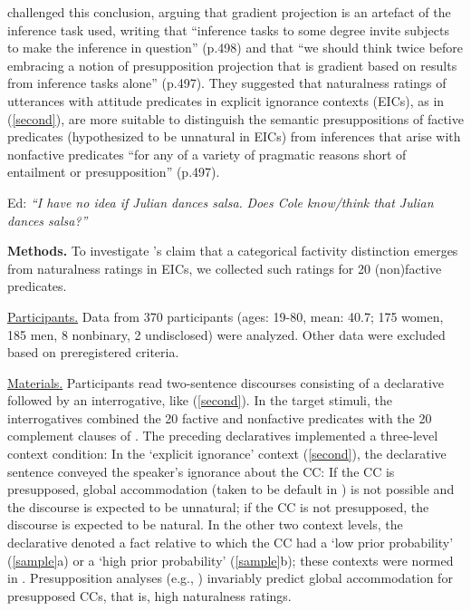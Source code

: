 \documentclass[12pt,fleqn]{article}
\newcommand{\6}{\mbox{$[\hspace*{-.6mm}[$}}
\newcommand{\9}{\mbox{$]\hspace*{-.6mm}]$}}
\newcommand{\citepos}[1]{\citeauthor{#1}'s \citeyear{#1}}
\begin{document}
\citealt{mandelkern-etal2020} challenged this conclusion, arguing that gradient projection is an artefact of the inference task used, writing that ``inference tasks to some degree invite subjects to make the inference in question'' (p.498) and that ``we should think twice before embracing a notion of presupposition projection that is gradient based on results from inference tasks alone'' (p.497). They suggested that naturalness ratings of utterances with attitude predicates in explicit ignorance contexts (EICs), as in (\ref{second}), are more suitable to distinguish the semantic presuppositions of factive predicates (hypothesized to be unnatural in EICs) from inferences that arise with nonfactive predicates ``for any of a variety of pragmatic reasons short of entailment or presupposition'' (p.497).

\vspace*{-.2cm}
\begin{exe}
\ex\label{second} Ed: \hspace*{-.2cm} {\em ``I have no idea if Julian dances salsa.}  \hspace*{-.1cm} {\em Does Cole know/think that Julian dances salsa?''}
\end{exe}
\vspace*{-.2cm}

\noindent
{\bf Methods.} To investigate \citepos{mandelkern-etal2020} claim that a categorical factivity distinction emerges from naturalness ratings in EICs, we collected such ratings for 20 (non)factive predicates. 

\noindent
\underline{Participants.} Data from 370 participants (ages: 19-80, mean: 40.7; 175 women, 185 men, 8 nonbinary, 2 undisclosed) were analyzed. Other data were excluded based on preregistered criteria.

\noindent
\underline{Materials.} Participants read two-sentence discourses consisting of a declarative followed by an interrogative, like (\ref{second}). In the target stimuli, the interrogatives combined the 20 factive and nonfactive predicates with the 20 complement clauses of \citealt{degen-tonhauser-openmind,degen-tonhauser-language}. The preceding declaratives implemented a three-level context condition: In the `explicit ignorance' context (\ref{second}), the declarative sentence conveyed the speaker's ignorance about the CC: If the CC is presupposed, global accommodation (taken to be default in \citealt{heim83,vds92}) is not possible and the discourse is expected to be unnatural; if the CC is not presupposed, the discourse is expected to be natural. In the other two context levels, the declarative denoted a fact relative to which the CC had a `low prior probability' (\ref{sample}a) or a `high prior probability' (\ref{sample}b); these contexts were normed in \citealt{degen-tonhauser-openmind}. Presupposition analyses (e.g., \citealt{heim83,vds92}) invariably predict global accommodation for presupposed CCs, that is, high naturalness ratings.
\end{document}
